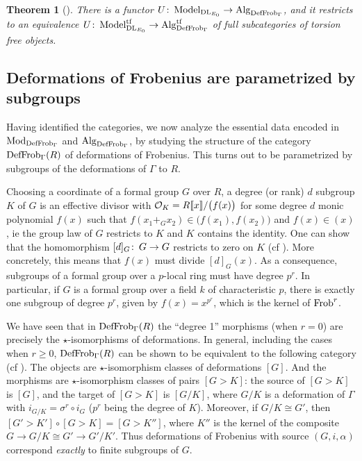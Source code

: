 \documentclass{gtpart}
\newtheorem{thm}{Theorem}
\theoremstyle{definition}
\theoremstyle{remark}
\def\co{\colon\thinspace}
\newcommand{\DL}{{\rm DL}}
\newcommand{\Mod}{{\rm Mod}}
\newcommand{\Alg}{{\rm Alg}}
\newcommand{\Frob}{{\rm Frob}}
\newcommand{\CO}{{\cal O}}
\newcommand{\DF}{{{\rm DefFrob}_\Gamma}}
\newcommand{\Model}{{\rm Model}}
\begin{document}
\begin{thm}[\cite{lpo}]
There is a functor $U\co \Model_{\DL_{E_0}} \to \Alg_\DF$, and it 
restricts to an equivalence $U\co \Model_{\DL_{E_0}}^{\rm tf} \to 
\Alg_\DF^{\rm tf}$ of full subcategories of torsion free objects.
\end{thm}


\subsection{Deformations of Frobenius are parametrized by subgroups}
\label{subsec:subgp}

Having identified the categories, we now analyze the essential data 
encoded in $\Mod_\DF$ and $\Alg_\DF$, by studying the structure of 
the category $\DF(R)$ of deformations of Frobenius.  This turns out 
to be parametrized by subgroups of the deformations of $\Gamma$ to $R$.

Choosing a coordinate of a formal group $G$ over $R$, 
a degree (or rank) $d$ subgroup $K$ of $G$ is an effective divisor with 
$\CO_K = R \llbracket x \rrbracket / \big(f(x)\big)$ for some degree $d$ 
monic polynomial $f(x)$ such that $f(x_1 +_G x_2) \in \big(f(x_1),f(x_2)\big)$ 
and $f(x) \in (x)$, ie the group law of $G$ restricts to $K$ and 
$K$ contains the identity.  One can show that the homomorphism 
$[d]_G\co G \to G$ restricts to zero on $K$ (cf \cite{tateoort}).  
More concretely, this means that $f(x)$ must divide $[d]_G(x)$.  
As a consequence, subgroups of a formal group over a $p$-local 
ring must have degree $p^r$.  In particular, if $G$ is a formal 
group over a field $k$ of characteristic $p$, there is exactly 
one subgroup of degree $p^r$, given by $f(x) = x^{p^r}$, which 
is the kernel of $\Frob^r$.  

We have seen that in $\DF(R)$ the ``degree 1'' morphisms (when $r = 0$) 
are precisely the $\star$-isomorphisms of deformations.  
In general, including the cases when $r \geq 0$, $\DF(R)$ can 
be shown to be equivalent to the following category (cf \cite{lpo}).  
The objects are $\star$-isomorphism classes of deformations $[G]$.  
And the morphisms are $\star$-isomorphism classes of pairs $[G > K]$: 
the source of $[G > K]$ is $[G]$, and the target of $[G > K]$ 
is $[G/K]$, where $G/K$ is a deformation of $\Gamma$ with 
$i_{G/K} = \sigma^r \circ i_G$ ($p^r$ being the degree of $K$).  
Moreover, if $G/K \cong G'$, then $[G' > K'] \circ [G > K] = 
[G > K'']$, where $K''$ is the kernel of the composite 
$G \to G/K \cong G' \to G'/K'$.  Thus deformations of Frobenius 
with source $(G,i,\alpha)$ correspond {\em exactly} to finite 
subgroups of $G$.  
\end{document}
